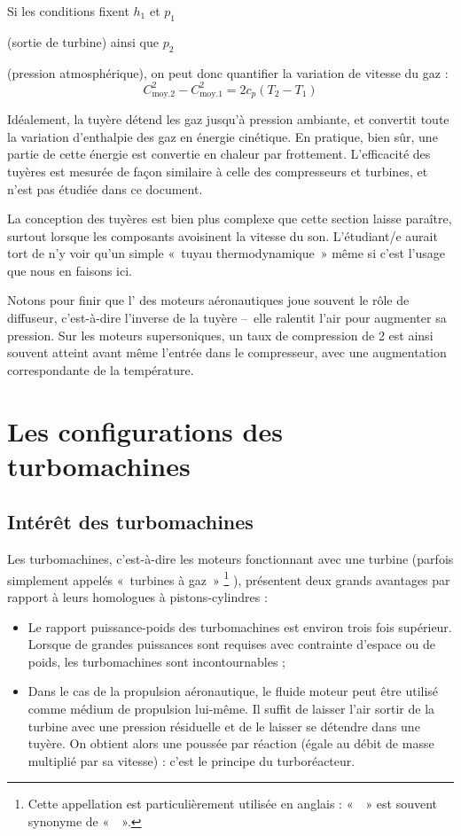 		Si les conditions fixent $h_1$ et $p_1$ {(sortie de turbine) ainsi que $p_2$ {(pression atmosphérique), on peut donc quantifier la variation de vitesse du gaz :
		\begin{equation}
			C_{\text{moy.}2}^2 - C_{\text{moy.}1}^2 	= 2 c_p (T_2 - T_1)
		\end{equation}

		Idéalement, la tuyère détend les gaz jusqu’à pression ambiante, et convertit toute la variation d’enthalpie des gaz en énergie cinétique. En pratique, bien sûr, une partie de cette énergie est convertie en chaleur par frottement. L’efficacité des tuyères est mesurée de façon similaire à celle des compresseurs et turbines, et n’est pas étudiée dans ce document.

		La conception des tuyères est bien plus complexe que cette section laisse paraître, surtout lorsque les composants avoisinent la vitesse du son. L’étudiant/e aurait tort de n’y voir qu’un simple «~tuyau thermodynamique~» même si c’est l’usage que nous en faisons ici.

		Notons pour finir que l’ des moteurs aéronautiques joue souvent le rôle de diffuseur, c’est-à-dire l’inverse de la tuyère --\ elle ralentit l’air pour augmenter sa pression. Sur les moteurs supersoniques, un taux de compression de 2 est ainsi souvent atteint avant même l’entrée dans le compresseur, avec une augmentation correspondante de la température.




\section{Les configurations des turbomachines}



	\subsection{Intérêt des turbomachines}

		Les turbomachines, c’est-à-dire les moteurs fonctionnant avec une turbine (parfois simplement appelés «~turbines à gaz~»%
			\footnote{Cette appellation est particulièrement utilisée en anglais : «~~» est souvent synonyme de «~~».}%
		), présentent deux grands avantages par rapport à leurs homologues à pistons-cylindres :

		\begin{itemize}
			\item Le rapport puissance-poids des turbomachines est environ trois fois supérieur. Lorsque de grandes puissances sont requises avec contrainte d’espace ou de poids, les turbomachines sont incontournables ;
			\item Dans le cas de la propulsion aéronautique, le fluide moteur peut être utilisé comme médium de propulsion lui-même. Il suffit de laisser l’air sortir de la turbine avec une pression résiduelle et de le laisser se détendre dans une tuyère. On obtient alors une poussée par réaction (égale au débit de masse multiplié par sa vitesse) : c’est le principe du turboréacteur.
		\end{itemize}

}}

